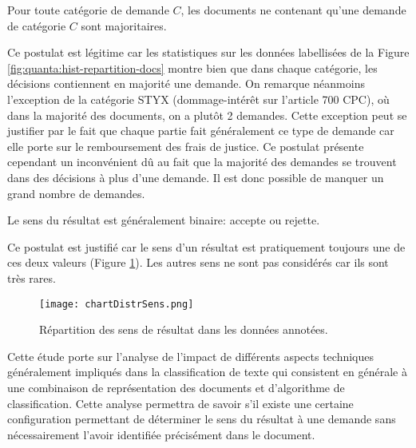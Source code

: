 \begin{postulat}\label{postulat:sens:unedemande}
Pour toute catégorie de demande $C$, les documents ne contenant qu'une demande de catégorie $C$ sont majoritaires. %
\end{postulat} 
Ce postulat est légitime car les statistiques sur les données labellisées de la Figure \ref{fig:quanta:hist-repartition-docs} montre bien que dans chaque catégorie, les décisions contiennent en majorité une demande. On remarque néanmoins l'exception de la catégorie STYX (dommage-intérêt sur l'article 700 CPC), où dans la majorité des documents, on a plutôt 2 demandes. Cette exception peut se justifier par le fait que chaque partie fait généralement ce type de demande car elle porte sur le remboursement des frais de justice. Ce postulat présente cependant un inconvénient dû au fait que la majorité des demandes se trouvent dans des décisions à plus d'une demande. Il est donc possible de manquer un grand nombre de demandes. %

\begin{postulat}\label{postulat:sens:sensbinaire}
Le sens du résultat est généralement binaire: accepte ou rejette.
\end{postulat} 
Ce postulat est justifié car le sens d'un résultat est pratiquement toujours une de ces deux valeurs (Figure \ref{stat-sensrst}). Les autres sens ne sont pas considérés car ils sont très rares.

\begin{figure}
\texttt{[image: chartDistrSens.png]}
\caption{Répartition des sens de résultat dans les données annotées.}\label{stat-sensrst}
\end{figure}

Cette étude porte sur l'analyse de l'impact de différents aspects techniques généralement impliqués dans la classification de texte qui consistent en générale à une combinaison de représentation des documents et d'algorithme de classification. Cette analyse permettra de savoir s'il existe une certaine configuration permettant de déterminer le sens du résultat à une demande sans nécessairement l'avoir identifiée précisément dans le document. 


